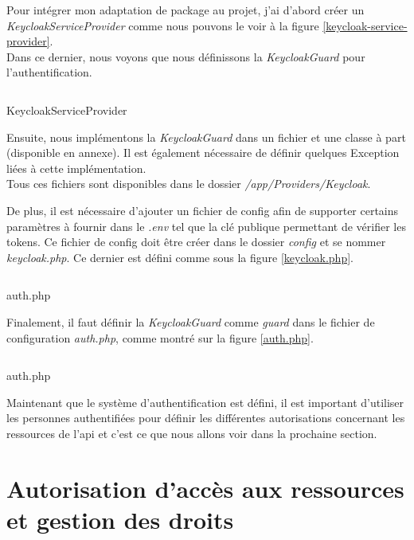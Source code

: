 \documentclass[
    iai, %
    il, %
]{heig-tb}
\begin{document}
Pour intégrer mon adaptation de package au projet, j'ai d'abord créer un \emph{KeycloakServiceProvider} comme nous pouvons le voir à la figure \ref{keycloak-service-provider}. \\
Dans ce dernier, nous voyons que nous définissons la \emph{KeycloakGuard} pour l'authentification.

\begin{listing}[H]
    \inputminted{php}{assets/code/KeycloakServiceProvider.php}
    \caption{KeycloakServiceProvider \label{keycloak-service-provider}}
\end{listing}

Ensuite, nous implémentons la \emph{KeycloakGuard} dans un fichier et une classe à part (disponible en annexe). Il est également nécessaire de définir quelques Exception liées à cette implémentation. \\
Tous ces fichiers sont disponibles dans le dossier \emph{/app/Providers/Keycloak}.

De plus, il est nécessaire d'ajouter un fichier de config afin de supporter certains paramètres à fournir dans le \emph{.env} tel que la clé publique permettant de vérifier les tokens. Ce fichier de config doit être créer dans le dossier \emph{config} et se nommer \emph{keycloak.php}. Ce dernier est défini comme sous la figure \ref{keycloak.php}.

\begin{listing}[h]
    \inputminted{php}{assets/code/keycloak.php}
    \caption{auth.php \label{keycloak.php}}
\end{listing}

Finalement, il faut définir la \emph{KeycloakGuard} comme \emph{guard} dans le fichier de configuration \emph{auth.php}, comme montré sur la figure \ref{auth.php}.

\begin{listing}[h]
    \inputminted{php}{assets/code/auth.php}
    \caption{auth.php \label{auth.php}}
\end{listing}

Maintenant que le système d'authentification est défini, il est important d'utiliser les personnes authentifiées pour définir les différentes autorisations concernant les ressources de l'\Gls{api} et c'est ce que nous allons voir dans la prochaine section.

\newpage

\section{Autorisation d'accès aux ressources et gestion des droits}
\end{document}
